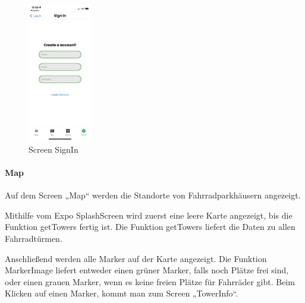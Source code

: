 \begin{figure}[H]
  \centering
  \includegraphics[width=0.25\textwidth]{images/app-screenshots/screenregister.png}
  \caption{Screen SignIn}
  \label{fig:signin}
\end{figure}

\bigskip


\paragraph{Map}Auf dem Screen „Map“ werden die Standorte von Fahrradparkhäusern angezeigt.

\noindent Mithilfe vom Expo SplashScreen wird zuerst eine leere Karte angezeigt, bis die Funktion getTowers fertig ist. Die Funktion getTowers liefert die Daten zu allen Fahrradtürmen.

\noindent Anschließend werden alle Marker auf der Karte angezeigt. Die Funktion MarkerImage liefert entweder einen grüner Marker, falls noch Plätze frei sind, oder einen grauen Marker, wenn es keine freien Plätze für Fahrräder gibt. Beim Klicken auf einen Marker, kommt man zum Screen „TowerInfo“.


